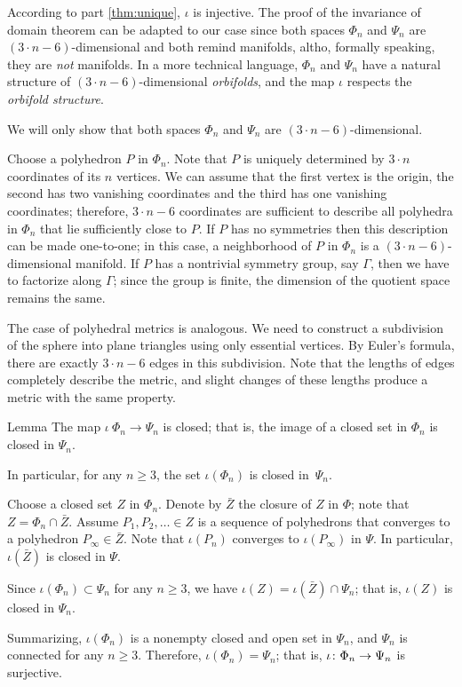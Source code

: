 \documentclass[oneside,a4paper]{article}
\begin{document}
According to part \ref{thm:unique}, $\iota$ is injective.
The proof of the invariance of domain theorem can be adapted to our case since both spaces $\Phi_n$ and $\Psi_n$ are $(3\cdot n-6)$-dimensional and both remind manifolds, altho, formally speaking, they are \emph{not} manifolds.
In a more technical language, $\Phi_n$ and $\Psi_n$ have a natural structure of $(3\cdot n-6)$-dimensional \emph{orbifolds},
and the map $\iota$ respects the \emph{orbifold structure}.

We will only show that both spaces $\Phi_n$ and $\Psi_n$ are $(3\cdot n-6)$-dimensional.

Choose a polyhedron $P$ in $\Phi_n$.
Note that $P$ is uniquely determined by $3\cdot n$ coordinates of its $n$ vertices.
We can assume that the first vertex is the origin, the second has two vanishing coordinates and the third has one vanishing coordinates; therefore, $3\cdot n-6$ coordinates are sufficient to describe all polyhedra in $\Phi_n$ that lie sufficiently close to $P$.
If $P$ has no symmetries then this description can be made one-to-one;
in this case, a neighborhood of $P$ in $\Phi_n$ is a $(3\cdot n-6)$-dimensional manifold.
If $P$ has a nontrivial symmetry group, say $\Gamma$, then we have to factorize along $\Gamma$;
since the group is finite, the dimension of the quotient space remains the same.

The case of polyhedral metrics is analogous.
We need to construct a subdivision of the sphere into plane triangles using only essential vertices.
By Euler's formula, there are exactly $3\cdot n-6$ edges in this subdivision.
Note that the lengths of edges completely describe the metric, and slight changes of these lengths produce a metric with the same property.

\begin{thm}{Lemma}
The map $\iota\:\Phi_n\to\Psi_n$ is closed;
that is, the image of a closed set in $\Phi_n$ is closed in $\Psi_n$.

In particular, for any $n\ge 3$, the set $\iota(\Phi_n)$ is closed in~$\Psi_n$.
\end{thm}

Choose a closed set $Z$ in $\Phi_n$.
Denote by $\bar Z$ the closure of $Z$ in $\Phi$; note that $Z=\Phi_n\cap \bar Z$.
Assume $P_1,P_2,\dots\in Z$ is a sequence of polyhedrons that converges to a polyhedron $P_\infty\in\bar Z$.
Note that $\iota(P_n)$ converges to $\iota(P_\infty)$ in $\Psi$.
In particular, $\iota(\bar Z)$ is closed in $\Psi$.

Since $\iota(\Phi_n)\subset \Psi_n$ for any $n\ge 3$, we have  $\iota (Z)=\iota(\bar Z)\cap \Psi_n$;
that is, $\iota (Z)$ is closed in $\Psi_n$. 

\medskip

Summarizing, $\iota(\Phi_n)$ is a nonempty closed and open set in $\Psi_n$, and $\Psi_n$ is connected for any $n\ge 3$.
Therefore, $\iota(\Phi_n)=\Psi_n$; that is, $\iota\:\Phi_n\z\to\Psi_n$ is surjective.
\qeds

\sloppy
\printbibliography[heading=bibintoc]
\fussy
\end{document}

